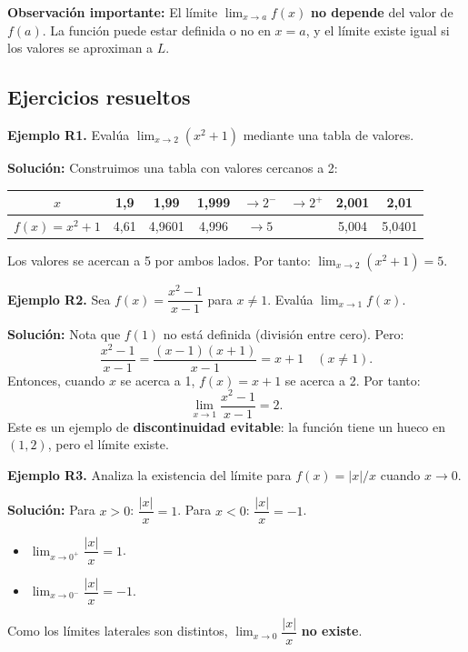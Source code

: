 \documentclass[12pt, letterpaper]{article}
\begin{document}
\begin{cuadrosolucion}
  \textbf{Observación importante:} El límite $\lim_{x \to a} f(x)$ \textbf{no depende} del valor de $f(a)$. La función puede estar definida o no en $x = a$, y el límite existe igual si los valores se aproximan a $L$.
\end{cuadrosolucion}

\subsection{Ejercicios resueltos}

\textbf{Ejemplo R1.} Evalúa $\lim_{x \to 2} (x^2 + 1)$ mediante una tabla de valores.

\begin{cuadrosolucion}
  \textbf{Solución:} Construimos una tabla con valores cercanos a 2:
  \begin{center}
    \small
    \begin{tabular}{cccccccc}
      \toprule
      $x$            & 1{,}9  & 1{,}99   & 1{,}999 & $\to 2^-$ & $\to 2^+$ & 2{,}001 & 2{,}01   \\
      \midrule
      $f(x) = x^2+1$ & 4{,}61 & 4{,}9601 & 4{,}996 & $\to 5$   &           & 5{,}004 & 5{,}0401 \\
      \bottomrule
    \end{tabular}
  \end{center}
  Los valores se acercan a 5 por ambos lados. Por tanto: $\lim_{x \to 2} (x^2 + 1) = 5$.
\end{cuadrosolucion}
\textbf{Ejemplo R2.} Sea $f(x) = \dfrac{x^2 - 1}{x - 1}$ para $x \neq 1$. Evalúa $\lim_{x \to 1} f(x)$.

\begin{cuadrosolucion}
  \textbf{Solución:} Nota que $f(1)$ no está definida (división entre cero). Pero:
  $$\frac{x^2 - 1}{x - 1} = \frac{(x - 1)(x + 1)}{x - 1} = x + 1 \quad (x \neq 1).$$
  Entonces, cuando $x$ se acerca a 1, $f(x) = x + 1$ se acerca a 2. Por tanto:
  $$\lim_{x \to 1} \frac{x^2 - 1}{x - 1} = 2.$$
  Este es un ejemplo de \textbf{discontinuidad evitable}: la función tiene un hueco en $(1, 2)$, pero el límite existe.
\end{cuadrosolucion}

\textbf{Ejemplo R3.} Analiza la existencia del límite para $f(x) = |x|/x$ cuando $x \to 0$.

\begin{cuadrosolucion}
  \textbf{Solución:} Para $x > 0$: $\dfrac{|x|}{x} = 1$. Para $x < 0$: $\dfrac{|x|}{x} = -1$.
  \begin{itemize}
    \item $\lim_{x \to 0^+} \dfrac{|x|}{x} = 1$.
    \item $\lim_{x \to 0^-} \dfrac{|x|}{x} = -1$.
  \end{itemize}
  Como los límites laterales son distintos, $\lim_{x \to 0} \dfrac{|x|}{x}$ \textbf{no existe}.
\end{cuadrosolucion}
\end{document}
